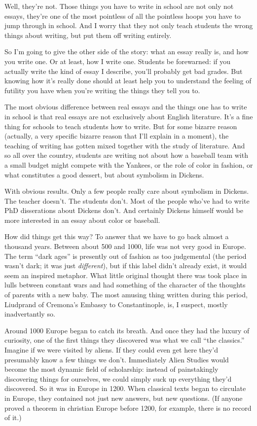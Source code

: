\documentclass[12pt]{book}
\begin{document}
Well, they're not. Those things you have to write in school are not only
not essays, they're one of the most pointless of all the pointless hoops
you have to jump through in school. And I worry that they not only teach
students the wrong things about writing, but put them off writing
entirely.

So I'm going to give the other side of the story: what an essay really
is, and how you write one. Or at least, how I write one. Students be
forewarned: if you actually write the kind of essay I describe, you'll
probably get bad grades. But knowing how it's really done should at
least help you to understand the feeling of futility you have when
you're writing the things they tell you to.

The most obvious difference between real essays and the things one has
to write in school is that real essays are not exclusively about English
literature. It's a fine thing for schools to teach students how to
write. But for some bizarre reason (actually, a very specific bizarre
reason that I'll explain in a moment), the teaching of writing has
gotten mixed together with the study of literature. And so all over the
country, students are writing not about how a baseball team with a small
budget might compete with the Yankees, or the role of color in fashion,
or what constitutes a good dessert, but about symbolism in Dickens.

With obvious results. Only a few people really care about symbolism in
Dickens. The teacher doesn't. The students don't. Most of the people
who've had to write PhD disserations about Dickens don't. And certainly
Dickens himself would be more interested in an essay about color or
baseball.

How did things get this way? To answer that we have to go back almost a
thousand years. Between about 500 and 1000, life was not very good in
Europe. The term ``dark ages'' is presently out of fashion as too
judgemental (the period wasn't dark; it was just \emph{different}), but
if this label didn't already exist, it would seem an inspired metaphor.
What little original thought there was took place in lulls between
constant wars and had something of the character of the thoughts of
parents with a new baby. The most amusing thing written during this
period, Liudprand of Cremona's Embassy to Constantinople, is, I suspect,
mostly inadvertantly so.

Around 1000 Europe began to catch its breath. And once they had the
luxury of curiosity, one of the first things they discovered was what we
call ``the classics.'' Imagine if we were visited by aliens. If they
could even get here they'd presumably know a few things we don't.
Immediately Alien Studies would become the most dynamic field of
scholarship: instead of painstakingly discovering things for ourselves,
we could simply suck up everything they'd discovered. So it was in
Europe in 1200. When classical texts began to circulate in Europe, they
contained not just new answers, but new questions. (If anyone proved a
theorem in christian Europe before 1200, for example, there is no record
of it.)
\end{document}
